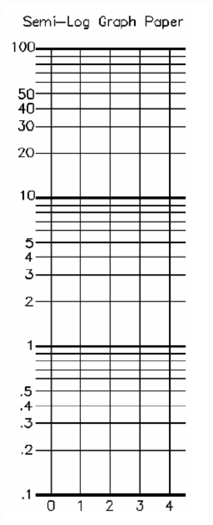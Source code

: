 \begin{minipage}[h]{0.3\textwidth}
\begin{flushright}
        \includegraphics[width=0.8\textwidth]{./Exp4/pic/imagelog.png}
    \end{flushright}
\end{minipage}


